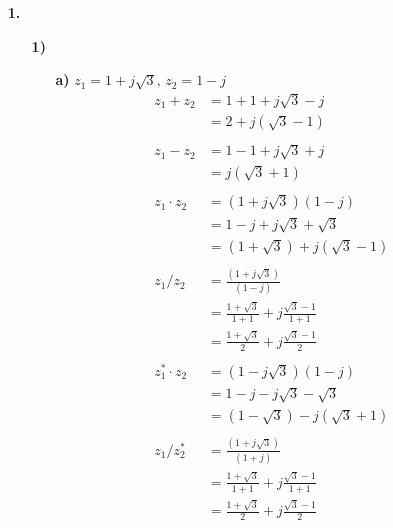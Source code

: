 \documentclass[a4paper,11pt]{article}
\author{\authorinfotitle}
\title{\titleinfo}
\date{\today}
\begin{document}
	\maketitle
	\begin{enumerate}
		\item[\textbf{1.}]
		\begin{enumerate}
			\item[\textbf{1)}]
			\begin{enumerate}
			\item[\textbf{a)}] $z_1 = 1+j\sqrt{3} \text{, } z_2=1-j$
			\begin{align*}
			z_1+z_2 &= 1+1+j\sqrt{3}-j \\
					&= 2+j(\sqrt{3}-1) \\\\
			z_1-z_2 &= 1-1+j\sqrt{3}+j \\
					&= j(\sqrt{3}+1)\\\\
			z_1 \cdot z_2 &= (1+j\sqrt{3})(1-j) \\
			              &= 1-j+j\sqrt{3}+\sqrt{3} \\
			              &= (1+\sqrt{3})+j(\sqrt{3}-1)\\\\
			z_1 / z_2 &= \frac{(1+j\sqrt{3})}{(1-j)} \\
			          &= \frac{1+\sqrt{3}}{1+1}+j\frac{\sqrt{3}-1}{1+1} \\
			          &= \frac{1+\sqrt{3}}{2}+j\frac{\sqrt{3}-1}{2}\\\\
			z_1^* \cdot z_2 &= (1-j\sqrt{3})(1-j) \\
			              &= 1-j-j\sqrt{3}-\sqrt{3} \\
			              &= (1-\sqrt{3})-j(\sqrt{3}+1)\\\\
			z_1 / z_2^* &= \frac{(1+j\sqrt{3})}{(1+j)} \\
			            &= \frac{1+\sqrt{3}}{1+1}+j\frac{\sqrt{3}-1}{1+1} \\
			            &= \frac{1+\sqrt{3}}{2}+j\frac{\sqrt{3}-1}{2}
			\end{align*}
			

\end{enumerate}
\end{enumerate}
\end{enumerate}
\end{document}
